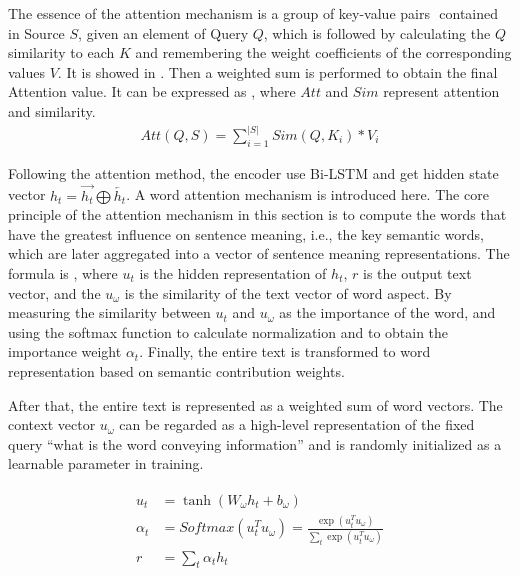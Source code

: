 The essence of the attention mechanism is a group of key-value pairs \(<K, V>\) contained in Source \(S\), given an element of Query \(Q\), which is followed by calculating the \(Q\) similarity to each \(K\) and remembering the weight coefficients of the corresponding values \(V\). It is showed in \figname{\ref{fig:ch2-model-attmodel}}. Then a weighted sum is performed to obtain the final Attention value. It can be expressed as \eqname{\ref{fml:ch2-attention}}, where \(Att\) and \(Sim\) represent attention and similarity.
\begin{align}\label{fml:ch2-attention}
    Att(Q,S) = \sum_{i=1}^{|S|}Sim(Q,K_i)*V_i
\end{align}

Following the attention method, the encoder use Bi-LSTM and get hidden state vector \(h_t=\overrightarrow{h_t}\bigoplus \overleftarrow{h_t}\). A word attention mechanism is introduced here. The core principle of the attention mechanism in this section is to compute the words that have the greatest influence on sentence meaning, i.e., the key semantic words, which are later aggregated into a vector of sentence meaning representations. The formula is \eqname{\ref{fml:ch2-att2}}, where \(u_t\) is the hidden representation of \(h_t\), \(r\) is the output text vector, and the \(u_\omega \) is the similarity of the text vector of word aspect. By measuring the similarity between \(u_t\) and \(u_\omega \) as the importance of the word, and using the softmax function to calculate normalization and to obtain the importance weight \(\alpha_{t}\). Finally, the entire text is transformed to word representation based on semantic contribution weights.

%
After that, the entire text is represented as a weighted sum of word vectors. The context vector \(u_\omega \) can be regarded as a high-level representation of the fixed query ``what is the word conveying information'' and is randomly initialized as a learnable parameter in training.


\begin{align}\label{fml:ch2-att2}
    \begin{split}
        u_t      & = \tanh(W_\omega h_t + b_\omega )                                                    \\
        \alpha_t & =Softmax(u_t^T u_\omega) = \frac{\exp( u_t^T u_\omega)}{\sum_t \exp(u_t^T u_\omega)} \\
        r        & = \sum_t{\alpha_t h_t}
    \end{split}
\end{align}

